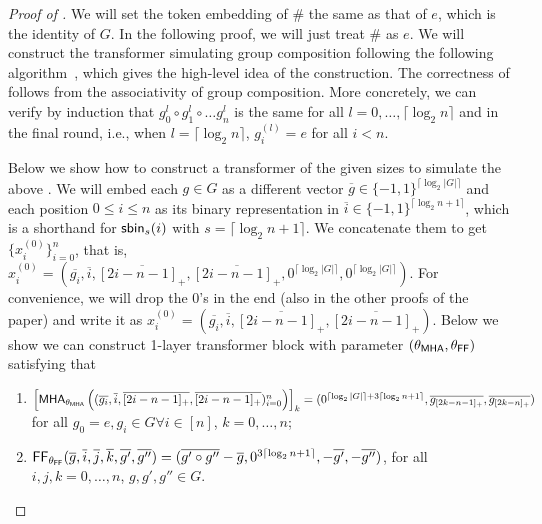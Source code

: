 \begin{proof}[Proof of ]
We will set the token embedding of $\#$ the same as that of $e$, which is the identity of $G$. In the following proof, we will just treat $\#$ as $e$. We will construct the transformer simulating group composition following the following algorithm~, which gives the high-level idea of the construction. The correctness of  follows from the associativity of group composition. More concretely, we can verify by induction that $g^{l}_0\circ g^{l}_1\circ\ldots g^{l}_n$ is the same for all $l=0,\ldots, \lceil \log_2 n\rceil$ and in the final round, i.e., when $l=\lceil \log_2 n\rceil$, $g^{(l)}_i=e$  for all $i<n$. 



Below we show how to construct a transformer of the given sizes to simulate the above .
We will embed each $g\in G$ as a different vector  $\overline{g} \in \{-1,1\}^{\lceil\log_2 |G|\rceil}$ and each position $0\le i\le n$ as its binary representation in $\overline{i} \in\{-1,1\}^{\lceil\log_2 n+1\rceil}$, which is a shorthand for $\mathsf{sbin}_s(i)$ with $s=\lceil\log_2 n+1\rceil$.
We concatenate them to get $\{x^{(0)}_i\}_{i=0}^n$, that is, $x^{(0)}_i = (\overline{g_i},\overline{i}, \overline{[2i-n-1]_+}, \overline{[2i-n-1]_+},0^{\lceil \log_2 |G|\rceil},0^{\lceil \log_2 |G|\rceil})$.
For convenience, we will drop the 0's in the end (also in the other proofs of the paper) and write it as $x^{(0)}_i = (\overline{g_i},\overline{i} , \overline{[2i-n-1]_+}, \overline{[2i-n-1]_+})$.
Below we show we can construct 1-layer transformer block with parameter $(\theta_{\mathsf{MHA}},\theta_{\mathsf{FF}})$ satisfying that
\begin{enumerate}
    \item $\left[ \mathsf{MHA}_{\theta_{\mathsf{MHA}}}\left((\overline{g_i},\overline{i},\overline{[2i-n-1]_+}, \overline{[2i-n-1]_+})_{i=0}^n\right)\right]_k = (0^{\lceil\log_2 |G|\rceil +3\lceil\log_2 n+1\rceil}, \overline{g_{[2k-n-1]_+}}, \overline{g_{[2k-n]_+}})$ \\for all $g_0=e,g_i\in G \forall i\in[n]$, $k=0,\ldots,n$;
    \item $\mathsf{FF}_{\theta_{\mathsf{FF}}}(\overline{g},\overline{i}, \overline{j}, \overline{k},\overline{g'}, \overline{g''}) = (\overline{g'\circ g''}-\overline{g}, 0^{3\lceil\log_2 n+1\rceil},-\overline{g'}, -\overline{g''})$, for all $i,j,k=0,\ldots,n$, $g,g',g''\in G$. 
\end{enumerate}


\end{proof}
